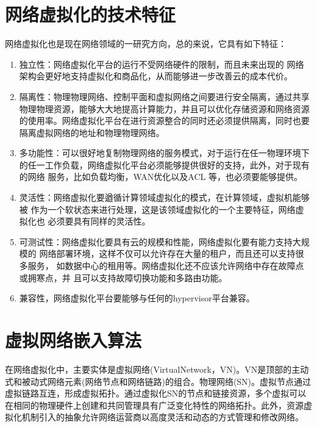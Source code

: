 



\section{网络虚拟化的技术特征}
网络虚拟化也是现在网络领域的一研究方向，总的来说，它具有如下特征：
\begin{enumerate}
  \item 独立性：网络虚拟化平台的运行不受网络硬件的限制，而且未来出现的 网络架构会更好地支持虚拟化和商品化，从而能够进一步改善云的成本代价。
  \item 隔离性：物理物理网络、控制平面和虚拟网络之间要进行安全隔离，通过共享物理物理资源，能够大大地提高计算能力，并且可以优化存储资源和网络资源的使用率。网络虚拟化平台在进行资源整合的同时还必须提供隔离，同时也要隔离虚拟网络的地址和物理物理网络。
  \item 多功能性：可以很好地复制物理网络的服务模式，对于运行在任一物理环境下的任一工作负载，网络虚拟化平台必须能够提供很好的支持，此外，对于现有的网络 服务，比如负载均衡，WAN优化以及ACL 等，也必须要能够提供。
  \item  灵活性：网络虚拟化要遒循计算领域虚拟化的模式，在计算领域，虚拟机能够被 作为一个软状态来进行处理，这是该领域虚拟化的一个主要特征，网络虚拟化也 必须要具有同样的灵活性。
  \item   可测试性：网络虚拟化要具有云的规模和性能，网络虚拟化要有能力支持大规模的 网络部署环境，这样不仅可以允许存在大量的租户，而且还可以支持很多服务， 如数据中心的租用等。网络虚拟化还不应该允许网络中存在故障点或拥寒点，并 且可以支持故障切换功能和多路由功能。
  \item 兼容性，网络虚拟化平台要能够与任何的hypervisor平台兼容。
\end{enumerate}


\section{虚拟网络嵌入算法}
在网络虚拟化中，主要实体是虚拟网络(VirtualNetwork，VN)。VN是顶部的主动式和被动式网络元素(网络节点和网络链路)的组合。物理网络(SN)。虚拟节点通过虚拟链路互连，形成虚拟拓扑。通过虚拟化SN的节点和链接资源，多个虚拟可以在相同的物理硬件上创建和共同管理具有广泛变化特性的网络拓扑。此外，资源虚拟化机制引入的抽象允许网络运营商以高度灵活和动态的方式管理和修改网络。

